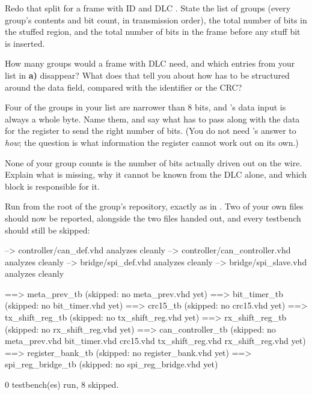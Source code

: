  Redo that split for a frame with ID  and DLC . State the list of groups
(every group's contents and bit count, in transmission order), the total number of bits in the
stuffed region, and the total number of bits in the frame before any stuff bit is inserted.

 How many groups would a frame with DLC  need, and which entries from your list in
\textbf{a)} disappear? What does that tell you about how  has to be structured
around the data field, compared with the identifier or the CRC?

 Four of the groups in your list are narrower than 8 bits, and 's data
input is always a whole byte. Name them, and say what  has to pass along with
the data for the register to send the right number of bits. (You do not need 's
answer to \emph{how}; the question is what information the register cannot work out on its own.)

 None of your group counts is the number of bits actually driven out on the wire. Explain
what is missing, why it cannot be known from the DLC alone, and which block is responsible for it.


\label{c11:ex:entity}
 Run  from the root of the group's repository, exactly as in
. Two of your own files should now be reported, alongside the two 
files handed out, and every testbench should still be skipped:

\begin{console}
--> controller/can_def.vhd analyzes cleanly
--> controller/can_controller.vhd analyzes cleanly
--> bridge/spi_def.vhd analyzes cleanly
--> bridge/spi_slave.vhd analyzes cleanly

==> meta_prev_tb (skipped: no meta_prev.vhd yet)
==> bit_timer_tb (skipped: no bit_timer.vhd yet)
==> crc15_tb (skipped: no crc15.vhd yet)
==> tx_shift_reg_tb (skipped: no tx_shift_reg.vhd yet)
==> rx_shift_reg_tb (skipped: no rx_shift_reg.vhd yet)
==> can_controller_tb (skipped: no meta_prev.vhd bit_timer.vhd crc15.vhd tx_shift_reg.vhd rx_shift_reg.vhd yet)
==> register_bank_tb (skipped: no register_bank.vhd yet)
==> spi_reg_bridge_tb (skipped: no spi_reg_bridge.vhd yet)

0 testbench(es) run, 8 skipped.
\end{console}

